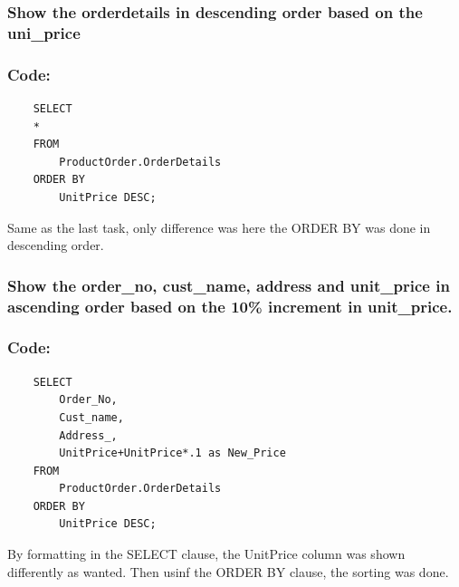 \documentclass[12pt]{article}
\begin{document}
\subsubsection{Show the orderdetails  in descending order based on the uni\_price}
\subsubsection*{Code:}
\begin{verbatim}
    SELECT
    *
    FROM
        ProductOrder.OrderDetails
    ORDER BY
        UnitPrice DESC;
\end{verbatim}
Same as the last task, only difference was here the ORDER BY was done in descending order.

\vspace{13mm}

\subsubsection{Show the order\_no, cust\_name, address and unit\_price  in ascending order based on the 10\% increment in unit\_price.}
\subsubsection*{Code:}
\begin{verbatim}
    SELECT
        Order_No,
        Cust_name,
        Address_,
        UnitPrice+UnitPrice*.1 as New_Price
    FROM
        ProductOrder.OrderDetails
    ORDER BY
        UnitPrice DESC;
\end{verbatim}
By formatting in the SELECT clause, the UnitPrice column was shown differently as wanted. Then usinf the ORDER BY clause, the sorting was done.

\vspace{13mm}
\end{document}
